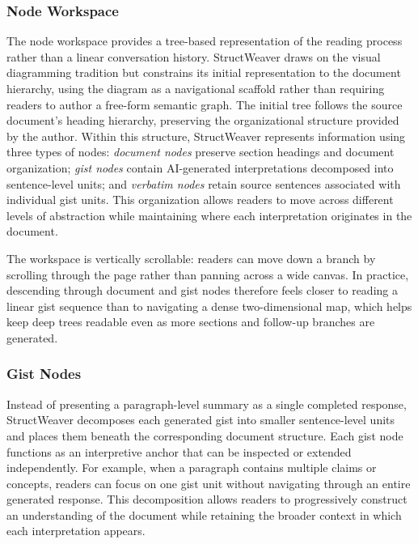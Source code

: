 \documentclass[manuscript,review,anonymous]{acmart}
\begin{document}
\subsubsection{Node Workspace}
The node workspace provides a tree-based representation of the reading process rather than a linear conversation history. StructWeaver draws on the visual diagramming tradition but constrains its initial representation to the document hierarchy, using the diagram as a navigational scaffold rather than requiring readers to author a free-form semantic graph. The initial tree follows the source document's heading hierarchy, preserving the organizational structure provided by the author. Within this structure, StructWeaver represents information using three types of nodes: \textit{document nodes} preserve section headings and document organization; \textit{gist nodes} contain AI-generated interpretations decomposed into sentence-level units; and \textit{verbatim nodes} retain source sentences associated with individual gist units. This organization allows readers to move across different levels of abstraction while maintaining where each interpretation originates in the document.

The workspace is vertically scrollable: readers can move down a branch by scrolling through the page rather than panning across a wide canvas. In practice, descending through document and gist nodes therefore feels closer to reading a linear gist sequence than to navigating a dense two-dimensional map, which helps keep deep trees readable even as more sections and follow-up branches are generated.

\subsubsection{Gist Nodes}
Instead of presenting a paragraph-level summary as a single completed response, StructWeaver decomposes each generated gist into smaller sentence-level units and places them beneath the corresponding document structure. Each gist node functions as an interpretive anchor that can be inspected or extended independently. For example, when a paragraph contains multiple claims or concepts, readers can focus on one gist unit without navigating through an entire generated response. This decomposition allows readers to progressively construct an understanding of the document while retaining the broader context in which each interpretation appears.
\end{document}
